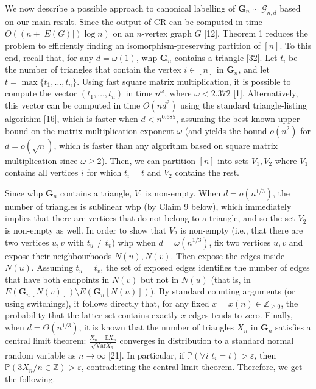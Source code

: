 We now describe a possible approach to canonical labelling of $\mathbf{G}_{n}\sim\mathcal{G}_{n,d}$ based on our main result. Since the output of CR can be computed in time $O((n+|E(G)|)\log n)$ on an $n$-vertex graph $G$ [12], Theorem 1 reduces the problem to efficiently finding an isomorphism-preserving partition of $[n]$. To this end, recall that, for any $d=\omega(1)$, whp $\mathbf{G}_{n}$ contains a triangle [32]. Let $t_{i}$ be the number of triangles that contain the vertex $i\in[n]$ in $\mathbf{G}_{n}$, and let $t=\max\{t_{1},\ldots,t_{n}\}.$ Using fast square matrix multiplication, it is possible to compute the vector $(t_{1},\ldots,t_{n})$ in time $n^{\omega}$, where $\omega<2.372$ [1]. Alternatively, this vector can be computed in time $O(nd^{2})$ using the standard triangle-listing algorithm [16], which is faster when $d<n^{0.685}$, assuming the best known upper bound on the matrix multiplication exponent $\omega$ (and yields the bound $o(n^{2})$ for $d=o(\sqrt{n})$, which is faster than any algorithm based on square matrix multiplication since $\omega\geq 2$). Then, we can partition $[n]$ into sets $V_{1},V_{2}$ where $V_{1}$ contains all vertices $i$ for which $t_{i}=t$ and $V_{2}$ contains the rest.\par




Since whp $\mathbf{G}_{n}$ contains a triangle, $V_{1}$ is non-empty. When $d=o(n^{1/3})$, the number of triangles is sublinear whp (by Claim 9 below), which immediately implies that there are vertices that do not belong to a triangle, and so the set $V_{2}$ is non-empty as well. In order to show that $V_{2}$ is non-empty (i.e., that there are two vertices $u,v$ with $t_{u}\neq t_{v}$) whp when $d=\omega(n^{1/3})$, fix two vertices $u,v$ and expose their neighbourhoods $N(u),N(v)$. Then expose the edges inside $N(u)$. Assuming $t_{u}=t_{v}$, the set of exposed edges identifies the number of edges that have both endpoints in $N(v)$ but not in $N(u)$ (that is, in $E(\mathbf{G}_{n}[N(v)])\setminus E(\mathbf{G}_{n}[N(u)])$). By standard counting arguments (or using switchings), it follows directly that, for any fixed $x=x(n)\in\mathbb{Z}_{\geq 0}$, the probability that the latter set contains exactly $x$ edges tends to zero. Finally, when $d=\Theta(n^{1/3})$, it is known that the number of triangles $X_{n}$ in $\mathbf{G}_{n}$ satisfies a central limit theorem: $\frac{X_{n}-\mathbb{E}X_{n}}{\sqrt{\mathrm{Var}X_{n}}}$ converges in distribution to a standard normal random variable as $n\to\infty$ [21]. In particular, if $\mathbb{P}(\forall i\,\,t_{i}=t)>\varepsilon$, then $\mathbb{P}(3X_{n}/n\in\mathbb{Z})>\varepsilon$, contradicting the central limit theorem. Therefore, we get the following.\par



